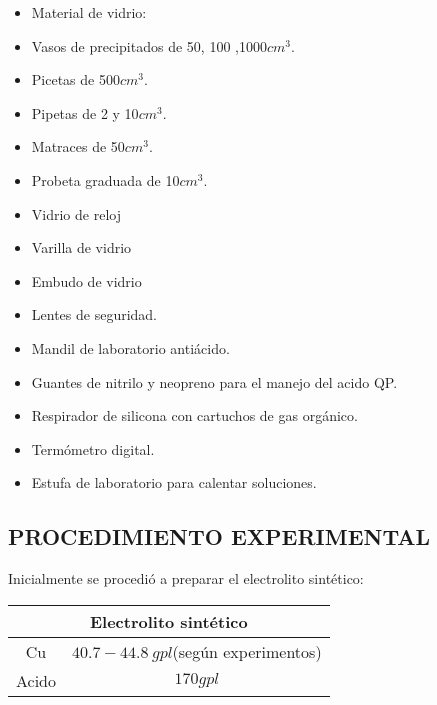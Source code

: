 \begin{itemize}
 \item Material de vidrio: 
 \item Vasos de precipitados de 50, 100 ,1000$cm^3$.
 \item Picetas de 500$cm^3$.
 \item Pipetas de 2 y 10$cm^3$.
 \item Matraces de 50$cm^3$.
 \item Probeta graduada de 10$cm^3$.
 \item Vidrio de reloj
 \item Varilla de vidrio
 \item Embudo de vidrio
 \item Lentes de seguridad.
 \item Mandil de laboratorio anti\'acido.
 \item Guantes de nitrilo y neopreno para el manejo del acido QP.
 \item Respirador de silicona con cartuchos de gas org\'anico.
 \item Term\'ometro digital.
 \item Estufa de laboratorio para calentar soluciones.
\end{itemize}

\subsection{PROCEDIMIENTO EXPERIMENTAL}
Inicialmente se procedi\'o a preparar el electrolito sint\'etico:

\begin{center}
 \begin{tabular}{|c|c|}
 \hline
 \multicolumn{2}{|c|}{Electrolito sint\'etico}\\
 \hline
 Cu& $40.7-44.8\:gpl$(seg\'un experimentos)\\
 \hline
 Acido&$170gpl$\\
 \hline
\end{tabular}
\end{center} 


